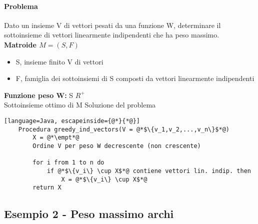 \paragraph*{Problema} Dato un insieme V di vettori pesati da una funzione W, determinare il sottoinsieme di
vettori linearmente indipendenti che ha peso massimo.\\
\textbf{Matroide $M = (S,F)$}\\
\begin{itemize}
    \item S, insieme finito V di vettori
    \item F, famiglia dei sottoinsiemi di S composti da vettori linearmente
    indipendenti
\end{itemize}
\textbf{Funzione peso W:} S \ra $R^+$\\
Sottoinsieme ottimo di M \ra Soluzione del problema
\begin{lstlisting}[language=Java, escapeinside={@*}{*@}]
    Procedura greedy_ind_vectors(V = @*$\{v_1,v_2,...,v_n\}$*@)
        X = @*\empt*@
        Ordine V per peso W decrescente (non crescente)

        for i from 1 to n do
            if @*$\{v_i\} \cup X$*@ contiene vettori lin. indip. then
                X = @*$\{v_i\} \cup X$*@
        return X
\end{lstlisting}
\subsection{Esempio 2 - Peso massimo archi}
